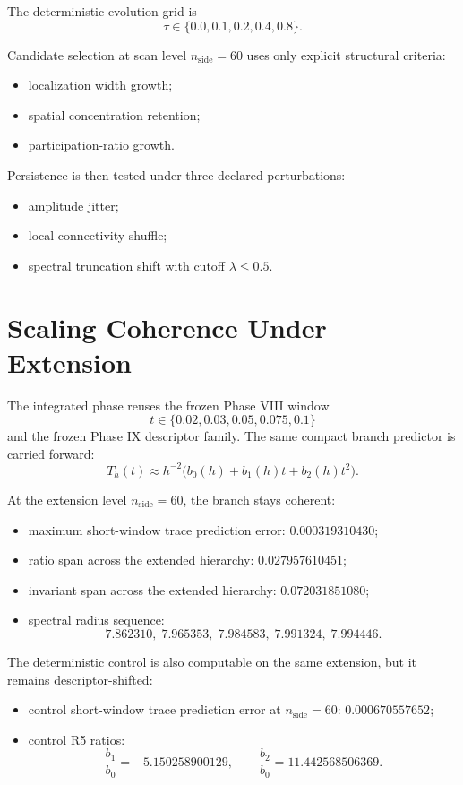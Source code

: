 \documentclass[11pt]{article}
\begin{document}
The deterministic evolution grid is
\[
\tau \in \{0.0,0.1,0.2,0.4,0.8\}.
\]

Candidate selection at scan level $n_{\mathrm{side}}=60$ uses only explicit structural criteria:
\begin{itemize}
\item localization width growth;
\item spatial concentration retention;
\item participation-ratio growth.
\end{itemize}

Persistence is then tested under three declared perturbations:
\begin{itemize}
\item amplitude jitter;
\item local connectivity shuffle;
\item spectral truncation shift with cutoff $\lambda \le 0.5$.
\end{itemize}

\section{Scaling Coherence Under Extension}

The integrated phase reuses the frozen Phase VIII window
\[
t \in \{0.02,0.03,0.05,0.075,0.1\}
\]
and the frozen Phase IX descriptor family. The same compact branch predictor is carried forward:
\[
T_h(t) \approx h^{-2}\bigl(b_0(h) + b_1(h)t + b_2(h)t^2\bigr).
\]

At the extension level $n_{\mathrm{side}}=60$, the branch stays coherent:
\begin{itemize}
\item maximum short-window trace prediction error: $0.000319310430$;
\item ratio span across the extended hierarchy: $0.027957610451$;
\item invariant span across the extended hierarchy: $0.072031851080$;
\item spectral radius sequence:
\[
7.862310,\;7.965353,\;7.984583,\;7.991324,\;7.994446.
\]
\end{itemize}

The deterministic control is also computable on the same extension, but it remains descriptor-shifted:
\begin{itemize}
\item control short-window trace prediction error at $n_{\mathrm{side}}=60$: $0.000670557652$;
\item control R5 ratios:
\[
\frac{b_1}{b_0} = -5.150258900129,\qquad
\frac{b_2}{b_0} = 11.442568506369.
\]
\end{itemize}
\end{document}
